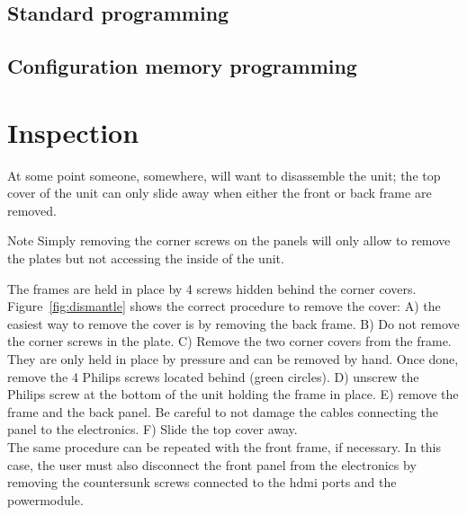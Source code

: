 \subsection{Standard programming}
\subsection{Configuration memory programming}

\section{Inspection}\label{ch:inspection}
At some point someone, somewhere, will want to disassemble the unit; the top cover of the unit can only slide away when either the front or back frame are removed.
\begin{alertinfo}{Note}
    Simply removing the corner screws on the panels will only allow to remove the plates but not accessing the inside of the unit.
\end{alertinfo}
The frames are held in place by 4 screws hidden behind the corner covers.\\Figure~\ref{fig:dismantle} shows the correct procedure to remove the cover: A) the easiest way to remove the cover is by removing the back frame. B) Do not remove the corner screws in the plate. C) Remove the two corner covers from the frame. They are only held in place by pressure and can be removed by hand. Once done, remove the 4 Philips screws located behind (green circles). D) unscrew the Philips screw at the bottom of the unit holding the frame in place. E) remove the frame and the back panel. Be careful to not damage the cables connecting the panel to the electronics. F) Slide the top cover away.\\
The same procedure can be repeated with the front frame, if necessary. In this case, the user must also disconnect the front panel from the electronics by removing the countersunk screws connected to the \gls{hdmi} ports and the powermodule.
